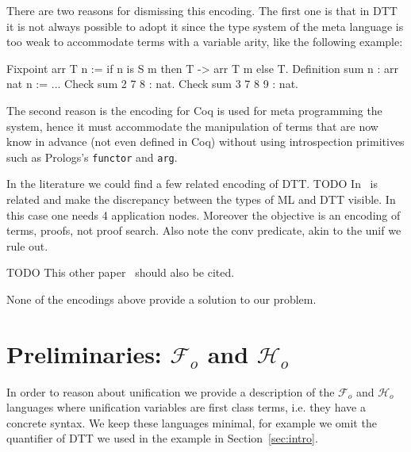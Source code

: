 \documentclass[sigconf,natbib=false]{acmart}
\newcommand{\Fo}{\ensuremath{\mathcal{F}_{\!o}\xspace}} %
\newcommand{\Ho}{\ensuremath{\mathcal{H}_o}\xspace}
\begin{document}
\noindent
There are two reasons for dismissing this encoding. The first one is that
in DTT it is not always possible to adopt it since the type system
of the meta language is too weak to accommodate terms with a variable arity,
like the following example:

\begin{coqcode}
Fixpoint arr T n := if n is S m then T -> arr T m else T.
Definition sum n : arr nat n := ...
Check sum 2   7 8   : nat.
Check sum 3   7 8 9 : nat.
\end{coqcode}

\noindent
The second reason is the encoding for Coq is used for meta programming the
system, hence it must accommodate the manipulation of terms that are now
know in advance (not even defined in Coq) without using introspection
primitives such as Prologs's \texttt{functor} and \texttt{arg}.

In the literature we could find a few related encoding of DTT.
TODO In~\cite{felty93lics} is related and make the
discrepancy between the types of ML and DTT visible. In this case
one needs 4 application nodes. Moreover the objective is an encoding
of terms, proofs, not proof search. Also note the conv predicate,
akin to the unif we rule out.

TODO This other paper~\cite{10.1007/978-3-031-38499-8_25} should also be cited.

None of the encodings above provide a solution to our problem.

\section{Preliminaries: \Fo{} and \Ho}
\label{sec:lang-spec}

In order to reason about unification we provide a description of the
\Fo{} and \Ho languages where unification variables
are first class terms, i.e. they have a concrete syntax. We keep these languages
minimal, for example we omit the  quantifier of DTT we used
in the example in Section~\ref{sec:intro}. 
%
\setlength{\abovecaptionskip}{0pt}
\setlength{\belowcaptionskip}{-13pt}
\end{document}
